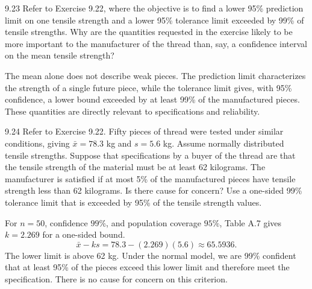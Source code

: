 \documentclass[11pt,oneside]{article}
\begin{document}
\begin{exercise}{9.23}
Refer to Exercise 9.22, where the objective is to find a lower 95\% prediction limit on one tensile strength and a lower 95\% tolerance limit exceeded by 99\% of tensile strengths. Why are the quantities requested in the exercise likely to be more important to the manufacturer of the thread than, say, a confidence interval on the mean tensile strength?
\end{exercise}
\begin{solution}
The mean alone does not describe weak pieces. The prediction limit characterizes the strength of a single future piece, while the tolerance limit gives, with 95\% confidence, a lower bound exceeded by at least 99\% of the manufactured pieces. These quantities are directly relevant to specifications and reliability.
\end{solution}

\begin{exercise}{9.24}
Refer to Exercise 9.22. Fifty pieces of thread were tested under similar conditions, giving $\bar x=78.3$ kg and $s=5.6$ kg. Assume normally distributed tensile strengths. Suppose that specifications by a buyer of the thread are that the tensile strength of the material must be at least 62 kilograms. The manufacturer is satisfied if at most 5\% of the manufactured pieces have tensile strength less than 62 kilograms. Is there cause for concern? Use a one-sided 99\% tolerance limit that is exceeded by 95\% of the tensile strength values.
\end{exercise}
\begin{solution}
For $n=50$, confidence $99\%$, and population coverage $95\%$, Table A.7 gives $k=2.269$ for a one-sided bound.
\[
\bar x-ks=78.3-(2.269)(5.6)\approx\boxed{65.5936}.
\]
The lower limit is above 62 kg. Under the normal model, we are 99\% confident that at least 95\% of the pieces exceed this lower limit and therefore meet the specification. There is no cause for concern on this criterion.
\end{solution}
\end{document}
